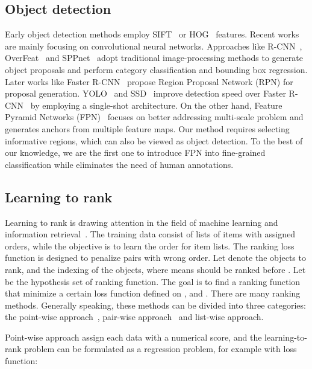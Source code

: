 \documentclass[runningheads]{llncs}
\begin{document}
\subsection{Object detection}
Early object detection methods employ SIFT~\cite{Lowe2004Distinctive} or HOG~\cite{Dalal2005Histograms} features.  Recent works are mainly focusing on convolutional neural networks. Approaches like R-CNN~\cite{girshick2014rich}, OverFeat~\cite{Sermanet2013OverFeat} and SPPnet~\cite{He2015Spatial} adopt traditional image-processing methods to generate object proposals and perform category classification and bounding box regression.  Later works like Faster R-CNN~\cite{ren2015faster} propose Region Proposal Network (RPN) for proposal generation. YOLO~\cite{Redmon2016You} and SSD~\cite{Liu2016SSD} improve detection speed over Faster R-CNN~\cite{ren2015faster} by employing a single-shot architecture. On the other hand, Feature Pyramid Networks (FPN)~\cite{Lin_2017_CVPR} focuses on better addressing multi-scale problem and generates anchors from multiple feature maps. Our method requires selecting informative regions, which can also be viewed as object detection. To the best of our knowledge, we are the first one to introduce FPN into fine-grained classification while eliminates the need of human annotations.


\subsection{Learning to rank} 
Learning to rank is drawing attention in the field of machine learning and information retrieval~\cite{Liu:2009:LRI:1618303.1618304}. The training data consist of lists of items with assigned orders, while the objective is to learn the order for item lists. The ranking loss function is designed to penalize pairs with wrong order. Let  denote the objects to rank, and  the indexing of the objects,  where  means  should be ranked before . Let  be the hypothesis set of ranking function.  The goal is to find a ranking function  that minimize a certain loss function defined on ,  and . There are many ranking methods. Generally speaking, these methods can be divided into three categories: the point-wise approach~\cite{Cossock2008Statistical}, pair-wise approach~\cite{Herbrich2000Large,Burges2005Learning} and list-wise approach\cite{Cao2007Learning,Xia2008Listwise}.

Point-wise approach assign each data with a numerical score, and the learning-to-rank problem can be formulated as a regression problem,  for example with  loss function:
\end{document}
